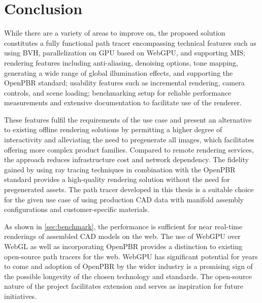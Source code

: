 \section{Conclusion}

While there are a variety of areas to improve on, the proposed solution constitutes a fully functional path tracer encompassing technical features such as using \gls{BVH}, parallelization on \gls{GPU} based on \gls{WebGPU}, and supporting \gls{MIS}; rendering features including anti-aliasing, denoising options, tone mapping, generating a wide range of global illumination effects, and supporting the \gls{OpenPBR} standard; usability features such as incremental rendering, camera controls, and scene loading; benchmarking setup for reliable performance measurements and extensive documentation to facilitate use of the renderer.

These features fulfil the requirements of the use case and present an alternative to existing offline rendering solutions by permitting a higher degree of interactivity and alleviating the need to pregenerate all images, which facilitates offering more complex product families. Compared to remote rendering services, the approach reduces infrastructure cost and network dependency. The fidelity gained by using ray tracing techniques in combination with the \gls{OpenPBR} standard provides a high-quality rendering solution without the need for pregenerated assets. The path tracer developed in this thesis is a suitable choice for the given use case of using production \gls{CAD} data with manifold assembly configurations and customer-specific materials.

As shown in \autoref{sec:benchmark}, the performance is sufficient for near real-time renderings of assembled \gls{CAD} models on the web. The use of \gls{WebGPU} over \gls{WebGL} as well as incorporating \gls{OpenPBR} provides a distinction to existing open-source path tracers for the web. \gls{WebGPU} has significant potential for years to come and adoption of \gls{OpenPBR} by the wider industry is a promising sign of the possible longevity of the chosen technology and standards. The open-source nature of the project facilitates extension and serves as inspiration for future initiatives.
